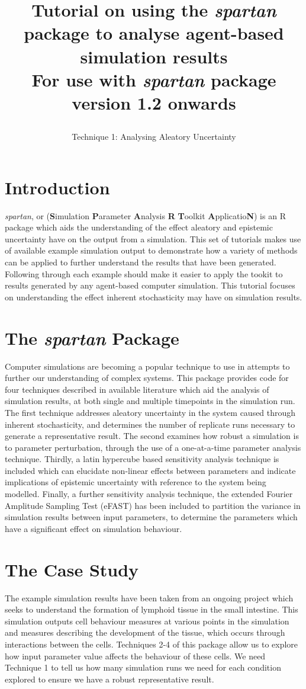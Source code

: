 \documentclass[a4paper,11pt]{article}
\title{\huge \textbf{Tutorial on using the \textit{spartan} package to analyse agent-based simulation results}\\
\Large For use with \textit{spartan} package version 1.2 onwards
\author{\Large Technique 1: Analysing Aleatory Uncertainty}
\date{}
}
\begin{document}
\maketitle


\section{Introduction}
\noindent \textit{spartan}, or (\textbf{S}imulation \textbf{P}arameter \textbf{A}nalysis \textbf{R} \textbf{T}oolkit \textbf{A}pplicatio\textbf{N}) is an R package which aids the understanding of the effect aleatory and epistemic uncertainty have on the output from a simulation.  This set of tutorials makes use of available example simulation output to demonstrate how a variety of methods can be applied to further understand the results that have been generated.  Following through each example should make it easier to apply the tookit to results generated by any agent-based computer simulation.  This tutorial focuses on understanding the effect inherent stochasticity may have on simulation results.

\section{The \textit{spartan} Package}
\noindent Computer simulations are becoming a popular technique to use in attempts to further our understanding of complex systems. This package provides code for four techniques described in available literature which aid the analysis of simulation results, at both single and multiple timepoints in the simulation run. The first technique addresses aleatory uncertainty in the system caused through inherent stochasticity, and determines the number of replicate runs necessary to generate a representative result. The second examines how robust a simulation is to parameter perturbation, through the use of a one-at-a-time parameter analysis technique. Thirdly, a latin hypercube based sensitivity analysis technique is included which can elucidate non-linear effects between parameters and indicate implications of epistemic uncertainty with reference to the system being modelled. Finally, a further sensitivity analysis technique, the extended Fourier Amplitude Sampling Test (eFAST) has been included to partition the variance in simulation results between input parameters, to determine the parameters which have a significant effect on simulation behaviour.

\section{The Case Study}
\noindent The example simulation results have been taken from an ongoing project which seeks to understand the formation of lymphoid tissue in the small intestine. This simulation outputs cell behaviour measures at various points in the simulation and measures describing the development of the tissue, which occurs through interactions between the cells. Techniques 2-4 of this package allow us to explore how input parameter value affects the behaviour of these cells. We need Technique 1 to tell us how many simulation runs we need for each condition explored to ensure we have a robust representative result.
\end{document}
